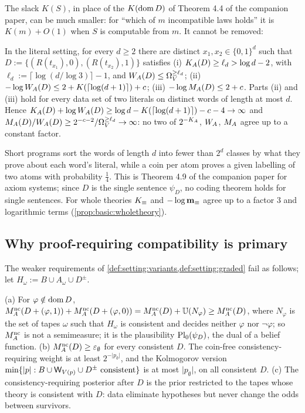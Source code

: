 The slack $K(S)$, in place of the $K(\operatorname{dom} D)$ of Theorem 4.4 of the companion paper, can be much smaller: for ``which of $m$ incompatible laws holds'' it is $K(m)+O(1)$ when $S$ is computable from $m$. It cannot be removed:

\begin{theorem}\label{thm:basic:nocoding}
In the literal setting, for every $d\ge2$ there are distinct $x_1,x_2\in\{0,1\}^d$ such that $D:=\{(R(t_{x_1}),0),(R(t_{x_2}),1)\}$ satisfies (i) $K_{A}(D)\ge\ell_d>\log d-2$, with $\ell_d:=\lceil\log(d/\log3)\rceil-1$, and $W_{A}(D)\le\Omega_{V}^{\ge \ell_d}$; (ii) $-\log W_{A}(D)\le2+K(\lceil\log(d+1)\rceil)+c$; (iii) $-\log M_{A}(D)\le2+c$. Parts (ii) and (iii) hold for every data set of two literals on distinct words of length at most $d$. Hence $K_{A}(D)+\log W_{A}(D)\ge\log d-K(\lceil\log(d+1)\rceil)-c-4\to\infty$ and $M_{A}(D)/W_{A}(D)\ge2^{-c-2}/\Omega_{V}^{\ge \ell_d}\to\infty$: no two of $2^{-K_{A}}$, $W_{A}$, $M_{A}$ agree up to a constant factor.
\end{theorem}

Short programs sort the words of length $d$ into fewer than $2^d$ classes by what they prove about each word's literal, while a coin per atom proves a given labelling of two atoms with probability $\frac14$. This is Theorem 4.9 of the companion paper for axiom systems; since $D$ is the single sentence $\psi_D$, no coding theorem holds for single sentences. For whole theories $K_{\equiv}$ and $-\log\mathbf{m}_{\equiv}$ agree up to a factor $3$ and logarithmic terms (\cref{prop:basic:wholetheory}).

\subsection{Why proof-requiring compatibility is primary}\label{sec:basic:primary}

The weaker requirements of \cref{def:setting:variants,def:setting:graded} fail as follows; let $H_\omega:=B\cup A_\omega\cup D^\pm$.

\begin{proposition}\label{prop:basic:cr}
(a) For $\varphi\notin\operatorname{dom} D$, $M_{A}^{\mathrm{nc}}(D+(\varphi,1))+M_{A}^{\mathrm{nc}}(D+(\varphi,0))=M_{A}^{\mathrm{nc}}(D)+\mathbb{U}(N_\varphi)\ge M_{A}^{\mathrm{nc}}(D)$, where $N_\varphi$ is the set of tapes $\omega$ such that $H_\omega$ is consistent and decides neither $\varphi$ nor $\neg\varphi$; so $M_{A}^{\mathrm{nc}}$ is not a semimeasure; it is the plausibility $\mathrm{Pl}_0(\psi_D)$, the dual of a belief function. (b) $M_{A}^{\mathrm{nc}}(D)\ge\varepsilon_{\emptyset}$ for every consistent $D$. The coin-free consistency-requiring weight is at least $2^{-\lvert p_\emptyset\rvert}$, and the Kolmogorov version $\min\{\lvert p\rvert:B\cup\mathsf{W}_{V(p)}\cup D^\pm\text{ consistent}\}$ is at most $\lvert p_\emptyset\rvert$, on all consistent $D$. (c) The consistency-requiring posterior after $D$ is the prior restricted to the tapes whose theory is consistent with $D$: data eliminate hypotheses but never change the odds between survivors.
\end{proposition}

